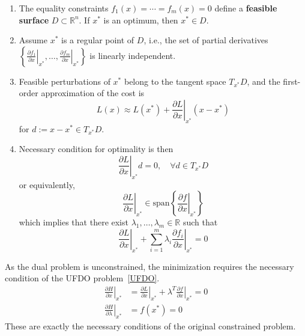 \begin{examplesection}
    \begin{enumerate}
        \item The equality constraints $f_1(x) = \cdots = f_m(x) = 0$ define a \textbf{feasible surface} $D \subset \mathbb{R}^n$. If $x^*$ is an optimum, then $x^* \in D$.
        \item Assume $x^*$ is a regular point of $D$, i.e., the set of partial derivatives $\left\{\left.\frac{\partial f_1}{\partial x}\right|_{x^*}, \dots, \left.\frac{\partial f_m}{\partial x}\right|_{x^*}\right\}$ is linearly independent.
        \item Feasible perturbations of $x^*$ belong to the tangent space $T_{x^*} D$, and the first-order approximation of the cost is
              \begin{equation*}
                  L(x) \approx L(x^*) + \left.\frac{\partial L}{\partial x}\right|_{x^*}(x - x^*)
              \end{equation*}
              for $d := x - x^* \in T_{x^*} D$.
        \item Necessary condition for optimality is then
              \begin{equation*}
                  \left.\frac{\partial L}{\partial x}\right|_{x^*} d = 0, \quad \forall d \in T_{x^*} D
              \end{equation*}
              or equivalently,
              \begin{equation*}
                  \left.\frac{\partial L}{\partial x}\right|_{x^*} \in \mathrm{span}\left\{ \left.\frac{\partial f}{\partial x}\right|_{x^*} \right\}
              \end{equation*}
              which implies that there exist $\lambda_1, \dots, \lambda_m \in \mathbb{R}$ such that
              \begin{equation*}
                  \left.\frac{\partial L}{\partial x}\right|_{x^*} + \sum_{i=1}^m \lambda_i \left.\frac{\partial f_i}{\partial x}\right|_{x^*} = 0
              \end{equation*}
    \end{enumerate}


    As the dual problem is unconstrained, the minimization requires the necessary condition of the UFDO problem~\ref{UFDO}.
    \begin{align*}
        \left.\frac{\partial H}{\partial x}\right|_{x^*}       & = \left.\frac{\partial L}{\partial x}\right|_{x^*} + \lambda^T \left.\frac{\partial f}{\partial x}\right|_{x^*} = 0 \\
        \left.\frac{\partial H}{\partial \lambda}\right|_{x^*} & = f(x^*) = 0
    \end{align*}
    These are exactly the necessary conditions of the original constrained problem.
\end{examplesection}

